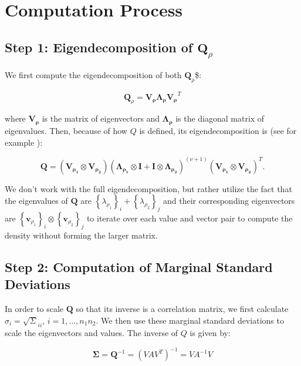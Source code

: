\documentclass[
  12pt]{article}
\begin{document}
\section{Computation Process}\label{computation-process}

\subsection{\texorpdfstring{Step 1: Eigendecomposition of
\(\mathbf{Q}_{\rho}\)}{Step 1: Eigendecomposition of \textbackslash mathbf\{Q\}\_\{\textbackslash rho\}}}\label{step-1-eigendecomposition-of-mathbfq_rho}

We first compute the eigendecomposition of both \(\mathbf{Q}_{\rho}\)\$:

\[
\mathbf{Q}_{\rho} = \mathbf{V_{\rho}}\mathbf{\Lambda_\rho}\mathbf{V_\rho}^T
\]

where \(\mathbf{V_\rho}\) is the matrix of eigenvectors and
\(\mathbf{\Lambda_\rho}\) is the diagonal matrix of eigenvalues. Then,
because of how \(Q\) is defined, its eigendecomposition is (see for
example \citep{matrixa}):

\[
\mathbf{Q} = (\mathbf{V_{\rho_1}} \otimes \mathbf{V_{\rho_2}})(\mathbf{\Lambda_{\rho_1}} \otimes \mathbf{I} + \mathbf{I} \otimes \mathbf{\Lambda_{\rho_2}})^{(\nu + 1)}(\mathbf{V_{\rho_1}} \otimes \mathbf{V_{\rho_2}})^T.
\]

We don't work with the full eigendecomposition, but rather utilize the
fact that the eigenvalues of \(\mathbf Q\) are
\(\left\{\lambda_{\rho_1}\right\}_i + \left\{\lambda_{\rho_2}\right\}_j\)
and their corresponding eigenvectors are
\(\left\{\mathbf{v}_{\rho_1}\right\}_i \otimes \left\{\mathbf{v}_{\rho_2}\right\}_j\)
to iterate over each value and vector pair to compute the density
without forming the larger matrix.

\subsection{Step 2: Computation of Marginal Standard
Deviations}\label{step-2-computation-of-marginal-standard-deviations}

In order to scale \(\mathbf Q\) so that its inverse is a correlation
matrix, we first calculate \(\sigma_i = \sqrt\Sigma_{ii}\),
\(i = 1, \dots, n_1n_2\). We then use these marginal standard deviations
to scale the eigenvectors and values. The inverse of \(Q\) is given by:

\[
\boldsymbol \Sigma = \mathbf Q^{-1} = (VAV^T)^{-1} = VA^{-1}V
\]
\end{document}
